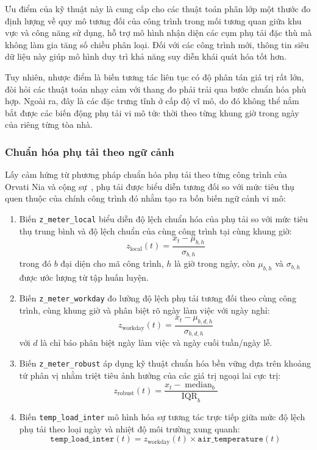 Ưu điểm của kỹ thuật này là cung cấp cho các thuật toán phân lớp một thước đo định lượng về quy mô tương đối của công trình trong mối tương quan giữa khu vực và công năng sử dụng, hỗ trợ mô hình nhận diện các cụm phụ tải đặc thù mà không làm gia tăng số chiều phân loại. Đối với các công trình mới, thông tin siêu dữ liệu này giúp mô hình duy trì khả năng suy diễn khái quát hóa tốt hơn.

Tuy nhiên, nhược điểm là biến tương tác liên tục có độ phân tán giá trị rất lớn, đòi hỏi các thuật toán nhạy cảm với thang đo phải trải qua bước chuẩn hóa phù hợp. Ngoài ra, đây là các đặc trưng tĩnh ở cấp độ vĩ mô, do đó không thể nắm bắt được các biến động phụ tải vi mô tức thời theo từng khung giờ trong ngày của riêng từng tòa nhà.

\subsubsection{Chuẩn hóa phụ tải theo ngữ cảnh}

Lấy cảm hứng từ phương pháp chuẩn hóa phụ tải theo từng công trình của Orvati Nia và cộng sự~\cite{orvati2026}, phụ tải được biểu diễn tương đối so với mức tiêu thụ quen thuộc của chính công trình đó nhằm tạo ra bốn biến ngữ cảnh vi mô:
\begin{enumerate}
    \item Biến \texttt{z\_meter\_local} biểu diễn độ lệch chuẩn hóa của phụ tải so với mức tiêu thụ trung bình và độ lệch chuẩn của cùng công trình tại cùng khung giờ:
    \begin{equation*}
        z_{\text{local}}(t) = \frac{x_t - \mu_{b,h}}{\sigma_{b,h}}
    \end{equation*}
    trong đó $b$ đại diện cho mã công trình, $h$ là giờ trong ngày, còn $\mu_{b,h}$ và $\sigma_{b,h}$ được ước lượng từ tập huấn luyện.
    \item Biến \texttt{z\_meter\_workday} đo lường độ lệch phụ tải tương đối theo cùng công trình, cùng khung giờ và phân biệt rõ ngày làm việc với ngày nghỉ:
    \begin{equation*}
        z_{\text{workday}}(t) = \frac{x_t - \mu_{b,d,h}}{\sigma_{b,d,h}}
    \end{equation*}
    với $d$ là chỉ báo phân biệt ngày làm việc và ngày cuối tuần/ngày lễ.
    \item Biến \texttt{z\_meter\_robust} áp dụng kỹ thuật chuẩn hóa bền vững dựa trên khoảng tứ phân vị nhằm triệt tiêu ảnh hưởng của các giá trị ngoại lai cực trị:
    \begin{equation*}
        z_{\text{robust}}(t) = \frac{x_t - \operatorname{median}_{b}}{\operatorname{IQR}_{b}}
    \end{equation*}
    \item Biến \texttt{temp\_load\_inter} mô hình hóa sự tương tác trực tiếp giữa mức độ lệch phụ tải theo loại ngày và nhiệt độ môi trường xung quanh:
    \begin{equation*}
        \texttt{temp\_load\_inter}(t) = z_{\text{workday}}(t) \times \texttt{air\_temperature}(t)
    \end{equation*}
\end{enumerate}

